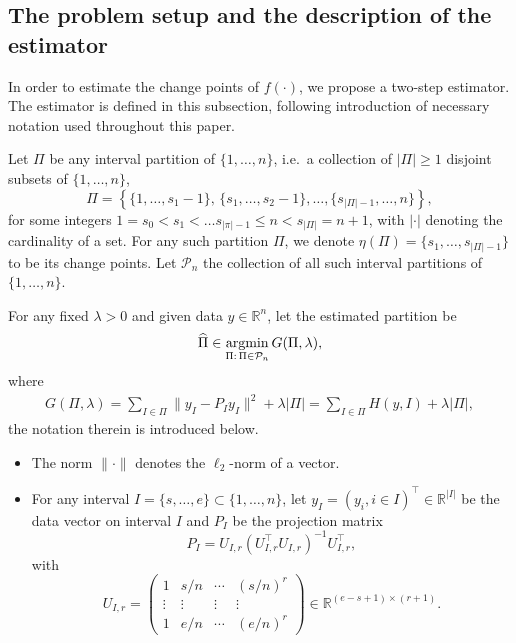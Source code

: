 \documentclass{article}
\def\argmin{\mathop{\rm argmin}}
\begin{document}
\subsection{The problem setup and the description of the estimator}\label{sec-problem-setup}

In order to estimate the change points of $f(\cdot)$, we propose a two-step estimator.  The estimator is defined in this subsection, following introduction of necessary notation used throughout this paper. 

Let $\Pi$ be any interval partition of $\{1, \ldots, n\}$, i.e.~a collection of $|\Pi| \geq 1$ disjoint subsets of $\{1, \ldots, n\}$,
	\[
		\Pi = \left\{\{1, \ldots, s_1 - 1\}, \, \{s_1, \ldots, s_2 - 1\}, \ldots, \{s_{|\Pi|-1}, \ldots, n\}\right\},
	\]
	for some integers $1 = s_0 < s_1 < \ldots s_{|\pi|-1} \leq n < s_{|\Pi|} = n+1$, with $|\cdot|$ denoting the cardinality of a set.  For any such partition $\Pi$, we denote $\eta(\Pi) = \{s_1, \ldots, s_{|\Pi|-1}\}$ to be its change points.  Let $\mathcal{P}_n$ the collection of all such interval partitions of $\{1, \ldots, n\}$.    
	
For any fixed $\lambda > 0$ and given data $y \in \mathbb{R}^n$, let the estimated partition be
	\begin{equation}\label{eq:defplse}
		\widehat{\Pi} \in \argmin_{\Pi: \, \Pi \in \mathcal{P}_n} G(\Pi, \lambda),
	\end{equation}	
	where 
	\begin{align}\label{eq-def-G-loss}
		G(\Pi, \lambda) = \sum_{I \in \Pi} \|y_I - P_I y_I\|^2 + \lambda|\Pi| = \sum_{I \in \Pi} H(y, I) + \lambda |\Pi|,
	\end{align}
	the notation therein is introduced below.
	\begin{itemize}
	\item The norm $\|\cdot\|$ denotes the $\ell_2$-norm of a vector.
	\item For any interval $I = \{s, \ldots, e\} \subset \{1, \ldots, n\}$, let $y_I = (y_i, i \in I)^{\top} \in \mathbb{R}^{|I|}$ be the data vector on interval $I$ and $P_I$ be the projection matrix 
	\begin{equation}\label{eq-P-I-definition}
		P_I = U_{I, r}(U_{I, r}^{\top}U_{I, r})^{-1}U_{I, r}^{\top},
	\end{equation}
	with
	\begin{equation}\label{eq-U-i-r}
		U_{I, r} = \left(\begin{array}{cccc}
				1 & s/n & \cdots & (s/n)^r \\
				\vdots & \vdots & \vdots & \vdots \\
				1 & e/n & \cdots & (e/n)^r  
			\end{array}\right) \in \mathbb{R}^{(e-s+1) \times (r+1)}.
	\end{equation}

	\end{itemize}
\end{document}
